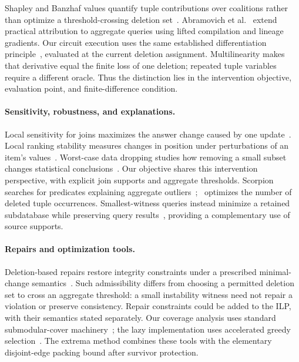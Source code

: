 Shapley and Banzhaf values quantify tuple contributions over coalitions
rather than optimize a threshold-crossing deletion
set~\cite{livshits2021shapley,abramovich2024banzhaf}. Abramovich
et al.~\cite{abramovich2025attribution} extend practical attribution to
aggregate queries using lifted compilation and lineage gradients. Our
circuit execution uses the same established differentiation
principle~\cite{baur1983derivatives}, evaluated at the current deletion
assignment. Multilinearity makes that derivative equal the finite loss of
one deletion; repeated tuple variables require a different oracle. Thus
the distinction lies in the intervention objective, evaluation point, and
finite-difference condition.

\paragraph{Sensitivity, robustness, and explanations.}
Local sensitivity for joins maximizes the answer change caused by one
update~\cite{tao2020sensitivity}. Local ranking stability measures changes
in position under perturbations of an item's
values~\cite{campbellLocalStability}. Worst-case data dropping studies how
removing a small subset changes statistical
conclusions~\cite{broderick2020dropping,huang2025dropping}. Our objective
shares this intervention perspective, with explicit join supports and
aggregate thresholds. Scorpion searches for predicates explaining
aggregate outliers~\cite{wu2013scorpion}; \MIW\ optimizes the number of
deleted tuple occurrences. Smallest-witness queries instead minimize a
retained subdatabase while preserving query
results~\cite{hu2024smallest}, providing a complementary use of source
supports.

\paragraph{Repairs and optimization tools.}
Deletion-based repairs restore integrity constraints under a prescribed
minimal-change semantics~\cite{chomicki2005minimal,bertossi2011repairs}.
Such admissibility differs from choosing a permitted deletion set to cross
an aggregate threshold: a small instability witness need not repair a
violation or preserve consistency. Repair constraints could be added to
the ILP, with their semantics stated separately. Our coverage analysis uses
standard submodular-cover machinery~\cite{wolsey1982greedy}; the lazy
implementation uses accelerated greedy selection~\cite{minoux1978lazy}.
The extrema method combines these tools with the elementary disjoint-edge
packing bound after survivor protection.
